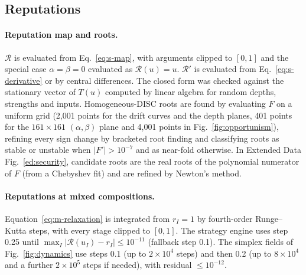 \documentclass[10pt]{wlscirep}
\newcommand{\Rmap}{\mathscr{R}}            %
\theoremstyle{plain}
\theoremstyle{remark}
\begin{document}
\subsection{Reputations}

\paragraph{Reputation map and roots.} $\Rmap$ is evaluated from Eq.~\eqref{eq:s-map}, with arguments clipped to $[0,1]$ and the special case $\alpha=\beta=0$ evaluated as $\Rmap(u)=u$. $\Rmap'$ is evaluated from Eq.~\eqref{eq:s-derivative} or by central differences. The closed form was checked against the stationary vector of $T(u)$ computed by linear algebra for random depths, strengths and inputs. Homogeneous-DISC roots are found by evaluating $F$ on a uniform grid (2,001 points for the drift curves and the depth planes, 401 points for the $161\times161$ $(\alpha,\beta)$ plane and 4,001 points in Fig.~\ref{fig:opportunism}), refining every sign change by bracketed root finding and classifying roots as stable or unstable when $|F'|>10^{-7}$ and as near-fold otherwise. In Extended Data Fig.~\ref{ed:security}, candidate roots are the real roots of the polynomial numerator of $F$ (from a Chebyshev fit) and are refined by Newton's method.

\paragraph{Reputations at mixed compositions.} Equation~\eqref{eq:m-relaxation} is integrated from $r_I=1$ by fourth-order Runge--Kutta steps, with every stage clipped to $[0,1]$. The strategy engine uses step 0.25 until $\max_I|\Rmap(u_I)-r_I|\leq10^{-11}$ (fallback step 0.1). The simplex fields of Fig.~\ref{fig:dynamics} use steps 0.1 (up to $2\times10^4$ steps) and then 0.2 (up to $8\times10^4$ and a further $2\times10^5$ steps if needed), with residual $\leq10^{-12}$.
\end{document}
